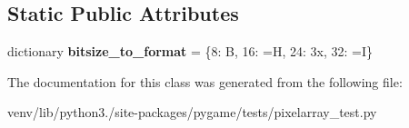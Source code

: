 \subsection*{Static Public Attributes}
\begin{DoxyCompactItemize}
\item 
\mbox{\label{classpygame_1_1tests_1_1pixelarray__test_1_1_pixel_array_new_buffer_test_a9e74afec33a842279cb4cbc9a8ceea6e}} 
dictionary {\bfseries bitsize\+\_\+to\+\_\+format} = \{8\+: \textquotesingle{}B\textquotesingle{}, 16\+: \textquotesingle{}=H\textquotesingle{}, 24\+: \textquotesingle{}3x\textquotesingle{}, 32\+: \textquotesingle{}=\+I\textquotesingle{}\}
\end{DoxyCompactItemize}


The documentation for this class was generated from the following file\+:\begin{DoxyCompactItemize}
\item 
venv/lib/python3./site-\/packages/pygame/tests/pixelarray\+\_\+test.\+py\end{DoxyCompactItemize}
